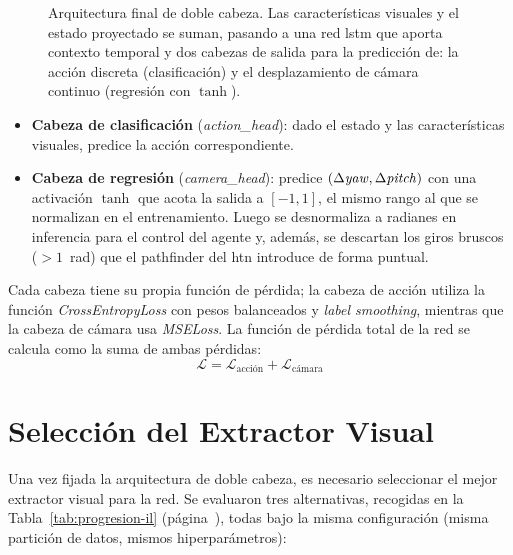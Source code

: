 \begin{figure}[htbp]
{
  }
  \caption[Arquitectura de doble cabeza del agente de imitación]{Arquitectura final
  de doble cabeza. Las características visuales y el estado proyectado se
  suman, pasando a una red \gls{lstm} que aporta contexto temporal y dos cabezas de salida para la predicción de:  
  la acción discreta (clasificación) y el desplazamiento de cámara continuo
  (regresión con $\tanh$).}
  \label{fig:il-arch-dual}
\end{figure}

\begin{itemize}
  \item \textbf{Cabeza de clasificación} (\textit{action\_head}): dado el estado y
  las características visuales, predice la acción correspondiente.
  \item \textbf{Cabeza de regresión} (\textit{camera\_head}): predice
  $(\Delta\text{\textit{yaw}}, \Delta\text{\textit{pitch}})$ con una activación $\tanh$ que acota la
  salida a $[-\num{1},\num{1}]$, el mismo rango al que se normalizan en
  el entrenamiento. Luego se desnormaliza a radianes en inferencia para el control del agente
  y, además, se descartan los giros bruscos ($>\num{1}$~rad) que el \gls{pathfinder} del \gls{htn} introduce de
  forma puntual.
\end{itemize}

Cada cabeza tiene su propia función de pérdida; la cabeza de acción utiliza la función
\textit{CrossEntropyLoss} con pesos balanceados y \textit{label smoothing}, 
mientras que la cabeza de cámara usa \textit{MSELoss}. La función de pérdida total de la red
se calcula como la suma de ambas pérdidas:
\begin{equation}
  \mathcal{L} = \mathcal{L}_{\text{acción}} + \mathcal{L}_{\text{cámara}}
\end{equation}
    
\section{Selección del Extractor Visual}
\label{sec:il-extractor}
Una vez fijada la arquitectura de doble cabeza, es necesario seleccionar el mejor extractor visual 
para la red. Se evaluaron tres alternativas, recogidas en la Tabla~\ref{tab:progresion-il} (página~\pageref{tab:progresion-il}), 
todas bajo la misma configuración (misma partición de datos, mismos hiperparámetros):


